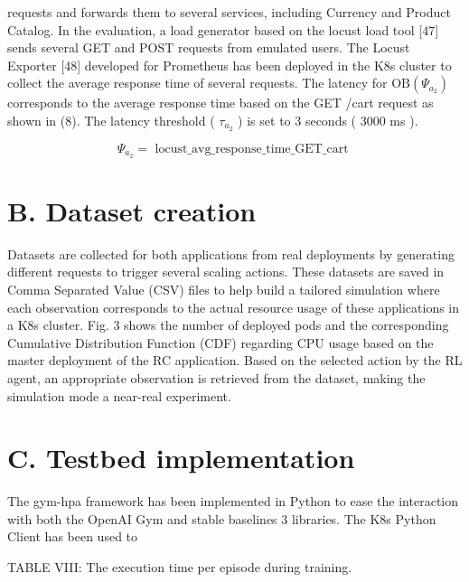 \documentclass[10pt]{article}
\begin{document}
requests and forwards them to several services, including Currency and Product Catalog. In the evaluation, a load generator based on the locust load tool [47] sends several GET and POST requests from emulated users. The Locust Exporter [48] developed for Prometheus has been deployed in the K8s cluster to collect the average response time of several requests. The latency for $\mathrm{OB}\left(\Psi_{a_{2}}\right)$ corresponds to the average response time based on the GET /cart request as shown in (8). The latency threshold ( $\tau_{a_{2}}$ ) is set to 3 seconds ( 3000 ms ).


\begin{equation*}
\Psi_{a_{2}}=\text { locust_avg_response_time_GET_cart } \tag{8}
\end{equation*}


\section*{B. Dataset creation}
Datasets are collected for both applications from real deployments by generating different requests to trigger several scaling actions. These datasets are saved in Comma Separated Value (CSV) files to help build a tailored simulation where each observation corresponds to the actual resource usage of these applications in a K8s cluster. Fig. 3 shows the number of deployed pods and the corresponding Cumulative Distribution Function (CDF) regarding CPU usage based on the master deployment of the RC application. Based on the selected action by the RL agent, an appropriate observation is retrieved from the dataset, making the simulation mode a near-real experiment.

\section*{C. Testbed implementation}
The gym-hpa framework has been implemented in Python to ease the interaction with both the OpenAI Gym and stable baselines 3 libraries. The K8s Python Client has been used to

TABLE VIII: The execution time per episode during training.
\end{document}
